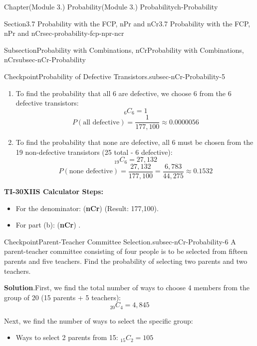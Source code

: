 \documentclass[oneside,10pt,]{book}
\newcommand{\blocktitlefont}{\relax}
\newcommand{\ptxlistdisc}{\raisebox{0.3ex}{\textbullet}}
\newcommand{\terminology}[1]{\textbf{#1}}
\newcommand{\kbd}[1]{\keys{{#1}}}
\begin{document}
\begin{chapterptx}{Chapter}{(Module 3.) Probability}{}{(Module 3.) Probability}{}{}{ch-Probability}
\begin{sectionptx}{Section}{3.7 Probability with the FCP, nPr and nCr}{}{3.7 Probability with the FCP, nPr and nCr}{}{}{sec-probability-fcp-npr-ncr}
\begin{subsectionptx}{Subsection}{Probability with Combinations, nCr}{}{Probability with Combinations, nCr}{}{}{subsec-nCr-Probability}
\begin{inlineexercise}{Checkpoint}{Probability of Defective Transistors.}{subsec-nCr-Probability-5}
%
\begin{enumerate}[label={\alph*}]
\item{}To find the probability that all 6 are defective, we choose 6 from the 6 defective transistors:%
\begin{equation*}
{}_{6}C_{6} = 1
\end{equation*}
%
\begin{equation*}
P(\text{all defective}) = \frac{1}{177,100} \approx 0.0000056
\end{equation*}
%
\item{}To find the probability that none are defective, all 6 must be chosen from the 19 non-defective transistors (25 total - 6 defective):%
\begin{equation*}
{}_{19}C_{6} = 27,132
\end{equation*}
%
\begin{equation*}
P(\text{none defective}) = \frac{27,132}{177,100} = \frac{6,783}{44,275} \approx 0.1532
\end{equation*}
%
\end{enumerate}
%
\par
\terminology{TI-30XIIS Calculator Steps:}%
\begin{itemize}[label=\ptxlistdisc]
\item{}For the denominator: \kbd{25} \kbd{PRB} (\terminology{nCr}) \kbd{6} \kbd{ENTER} (Result: 177,100).%
\item{}For part (b): \kbd{19} \kbd{PRB} (\terminology{nCr}) \kbd{6} \kbd{÷} \kbd{177,100} \kbd{ENTER}.%
\end{itemize}
%
\end{inlineexercise}%
\begin{inlineexercise}{Checkpoint}{Parent-Teacher Committee Selection.}{subsec-nCr-Probability-6}%
A parent-teacher committee consisting of four people is to be selected from fifteen parents and five teachers. Find the probability of selecting two parents and two teachers.%
\par\smallskip%
\noindent\textbf{\blocktitlefont Solution}.\hypertarget{subsec-nCr-Probability-6-3}{}\quad{}First, we find the total number of ways to choose 4 members from the group of 20 (15 parents + 5 teachers):%
\begin{equation*}
{}_{20}C_{4} = 4,845
\end{equation*}
%
\par
Next, we find the number of ways to select the specific group:%
\begin{itemize}[label=\ptxlistdisc]
\item{}Ways to select 2 parents from 15: \({}_{15}C_{2} = 105\)%

\end{itemize}
\end{inlineexercise}
\end{subsectionptx}
\end{sectionptx}
\end{chapterptx}
\end{document}
